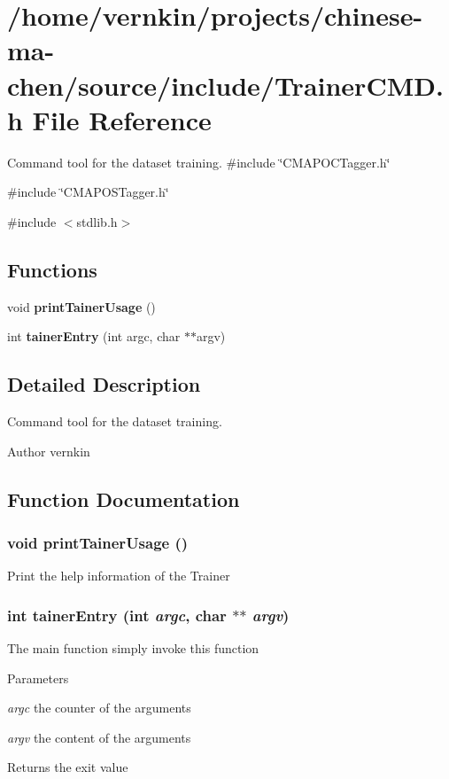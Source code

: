 \section{/home/vernkin/projects/chinese-\/ma-\/chen/source/include/TrainerCMD.h File Reference}
\label{TrainerCMD_8h}


Command tool for the dataset training.  
{\ttfamily \#include \char`\"{}CMAPOCTagger.h\char`\"{}}\par
{\ttfamily \#include \char`\"{}CMAPOSTagger.h\char`\"{}}\par
{\ttfamily \#include $<$stdlib.h$>$}\par
\subsection*{Functions}
\begin{DoxyCompactItemize}
\item 
void {\bf printTainerUsage} ()
\item 
int {\bf tainerEntry} (int argc, char $\ast$$\ast$argv)
\end{DoxyCompactItemize}


\subsection{Detailed Description}
Command tool for the dataset training. \begin{DoxyAuthor}{Author}
vernkin 
\end{DoxyAuthor}


\subsection{Function Documentation}
\subsubsection[{printTainerUsage}]{\setlength{\rightskip}{0pt plus 5cm}void printTainerUsage ()}\label{TrainerCMD_8h_acadfbf3ad2e202a3d175a59bac8079a1}
Print the help information of the Trainer 
\subsubsection[{tainerEntry}]{\setlength{\rightskip}{0pt plus 5cm}int tainerEntry (int {\em argc}, \/  char $\ast$$\ast$ {\em argv})}\label{TrainerCMD_8h_a16127519ffec951fcf4cf053c2a573a5}
The main function simply invoke this function


\begin{DoxyParams}{Parameters}
\item[{\em argc}]the counter of the arguments \item[{\em argv}]the content of the arguments \end{DoxyParams}
\begin{DoxyReturn}{Returns}
the exit value 
\end{DoxyReturn}

